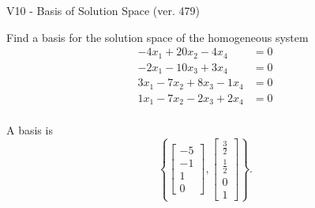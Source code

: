 \begin{exercise}
  \begin{exerciseTitle}V10 - Basis of Solution Space (ver. 479)\end{exerciseTitle}
  \begin{exerciseStatement}
    Find a basis for the solution space of the homogeneous system 
\begin{align*}
 -4 x_ 1 + 20 x_ 2 -4 x_ 4 &= 0  \\ 
  -2 x_ 1 -10 x_ 3 + 3 x_ 4 &= 0  \\ 
  3 x_ 1 -7 x_ 2 + 8 x_ 3 -1 x_ 4 &= 0  \\ 
  1 x_ 1 -7 x_ 2 -2 x_ 3 + 2 x_ 4 &= 0  \\ 
 \end{align*}


 
  \end{exerciseStatement}

  \begin{exerciseAnswer}
   A basis is   
\[\left\{\left[\begin{array}{c}
-5 \\
-1 \\
1 \\
0
\end{array}\right] , \left[\begin{array}{c}
\frac{3}{2} \\
\frac{1}{2} \\
0 \\
1
\end{array}\right]\right\}.\]

  


  \end{exerciseAnswer}
\end{exercise}